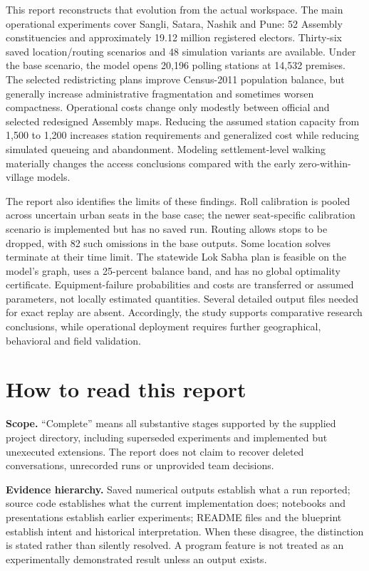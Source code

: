 \documentclass[11pt,a4paper,oneside]{report}
\begin{document}
This report reconstructs that evolution from the actual workspace. The main operational experiments cover Sangli, Satara, Nashik and Pune: 52 Assembly constituencies and approximately 19.12 million registered electors. Thirty-six saved location/routing scenarios and 48 simulation variants are available. Under the base scenario, the model opens 20,196 polling stations at 14,532 premises. The selected redistricting plans improve Census-2011 population balance, but generally increase administrative fragmentation and sometimes worsen compactness. Operational costs change only modestly between official and selected redesigned Assembly maps. Reducing the assumed station capacity from 1,500 to 1,200 increases station requirements and generalized cost while reducing simulated queueing and abandonment. Modeling settlement-level walking materially changes the access conclusions compared with the early zero-within-village models.

The report also identifies the limits of these findings. Roll calibration is pooled across uncertain urban seats in the base case; the newer seat-specific calibration scenario is implemented but has no saved run. Routing allows stops to be dropped, with 82 such omissions in the base outputs. Some location solves terminate at their time limit. The statewide Lok Sabha plan is feasible on the model's graph, uses a 25-percent balance band, and has no global optimality certificate. Equipment-failure probabilities and costs are transferred or assumed parameters, not locally estimated quantities. Several detailed output files needed for exact replay are absent. Accordingly, the study supports comparative research conclusions, while operational deployment requires further geographical, behavioral and field validation.

\chapter*{How to read this report}
\textbf{Scope.} ``Complete'' means all substantive stages supported by the supplied project directory, including superseded experiments and implemented but unexecuted extensions. The report does not claim to recover deleted conversations, unrecorded runs or unprovided team decisions.

\textbf{Evidence hierarchy.} Saved numerical outputs establish what a run reported; source code establishes what the current implementation does; notebooks and presentations establish earlier experiments; README files and the blueprint establish intent and historical interpretation. When these disagree, the distinction is stated rather than silently resolved. A program feature is not treated as an experimentally demonstrated result unless an output exists.
\end{document}
